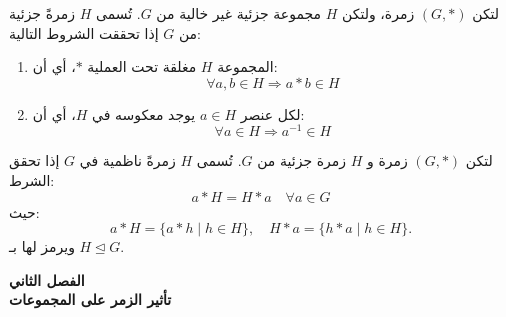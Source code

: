 		\begin{frame}
			\begin{definition}
				لتكن $(G, *)$ زمرة، ولتكن $H$ مجموعة جزئية غير خالية من $G$. تُسمى $H$ زمرةً جزئية من $G$ إذا تحققت الشروط التالية:
				\begin{enumerate}
					\item المجموعة $H$ مغلقة تحت العملية $*$، أي أن:
					\[
					\forall a, b \in H \Rightarrow a * b \in H
					\]
					
					\item لكل عنصر $a \in H$ يوجد معكوسه في $H$، أي أن:
					\[
					\forall a \in H \Rightarrow a^{-1} \in H
					\]
				\end{enumerate}
			\end{definition}
		\end{frame}
		
		\begin{frame}
			\begin{definition}
				لتكن $(G, *)$ زمرة و $H$ زمرة جزئية من $G$. تُسمى $H$ زمرةً ناظمية في $G$ إذا تحقق الشرط:
				\[
				a * H = H * a \quad \forall a \in G
				\]
				حيث:
				\[
				a * H = \{a * h \mid h \in H\}, \quad H * a = \{h * a \mid h \in H\}.
				\]
				ويرمز لها بـ $H \trianglelefteq G$.
			\end{definition}
		\end{frame}
		
		\begin{frame}
			\begin{center}
				\Huge
				\textbf{الفصل الثاني}\\
				\textbf{تأثير الزمر على المجموعات}
			\end{center}
		\end{frame}
		
